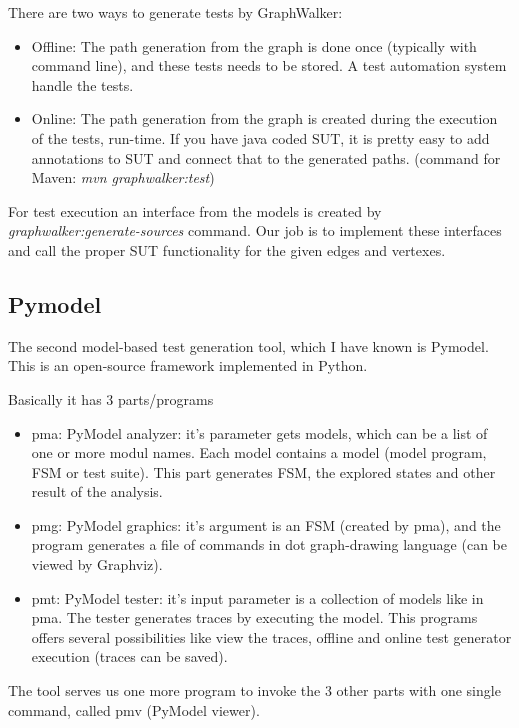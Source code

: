 There are two ways to generate tests by GraphWalker:
\begin{itemize}
	\item Offline: The path generation from the graph is done once (typically with command line), and these tests needs to be stored. A test automation system handle the tests. 
	\item Online: The path generation from the graph is created during the execution of the tests, run-time. If you have java coded SUT, it is pretty easy to add annotations to SUT and connect that to the generated paths. (command for Maven: \textit{mvn graphwalker:test})
\end{itemize}

For test execution an interface from the models is created by \textit{graphwalker:generate-sources} command. Our job is to implement these interfaces and call the proper SUT functionality for the given edges and vertexes.

\subsection{Pymodel} \label{mbt:tools:pymodel}

The second model-based test generation tool, which I have known is Pymodel. This is an open-source framework implemented in Python. 

Basically it has 3 parts/programs
\begin{itemize}
	\item pma: PyModel analyzer: it's parameter gets models, which can be a list of one or more modul names.  Each model contains a model (model program, FSM or test suite). This part generates FSM, the explored states and other result of the analysis.
	\item pmg: PyModel graphics: it's argument is an FSM (created by pma), and the program generates a file of commands in dot graph-drawing language (can be viewed by Graphviz). 
	\item pmt: PyModel tester: it's input parameter is a collection of models like in pma. The tester generates traces by executing the model. This programs offers several possibilities like view the traces, offline and online test generator execution (traces can be saved). 
\end{itemize}

The tool serves us one more program to invoke the 3 other parts with one single command, called pmv (PyModel viewer).


